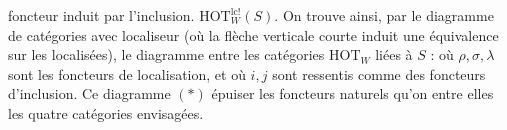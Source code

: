 foncteur induit par l'inclusion. 
$\mathrm{HOT}_W^{\mathrm{lc}!}(S)$. On trouve ainsi, par le diagramme
 de catégories avec localiseur
(où la flèche verticale courte induit une équivalence sur les localisées), le diagramme 
entre les catégories $\mathrm{HOT}_W$ liées à $S$ :
où $\rho,\sigma,\lambda$ sont les foncteurs de localisation,
et où $i,j$ sont ressentis comme des
foncteurs d'inclusion. Ce diagramme $(*)$
 épuiser les foncteurs naturels qu'on 
 entre elles les quatre catégories envisagées.
